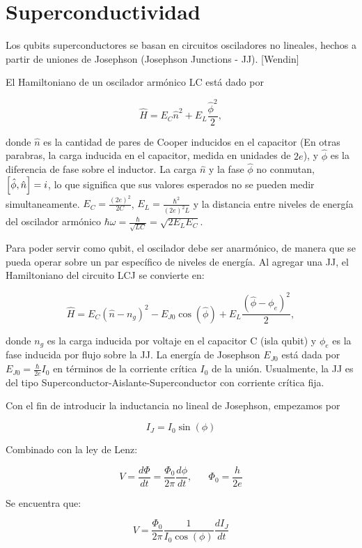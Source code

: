\documentclass[11pt, spanish]{report}
\begin{document}
\chapter{Superconductividad}
Los qubits superconductores se basan en circuitos osciladores no lineales, hechos a partir de uniones de Josephson (Josephson Junctions - JJ). [Wendin]
\vspace{0.5cm}

El Hamiltoniano de un oscilador armónico LC está dado por 

\[
\hat{H} = E_C \hat{n}^2 + E_L \frac{\hat{\phi}^2}{2},
\]

donde $\hat{n}$ es la cantidad de pares de Cooper inducidos en el capacitor (En otras parabras, la carga inducida en el capacitor, medida en unidades de $2e$), y $\hat{\phi}$ es la diferencia de fase sobre el inductor. La carga $\hat{n}$ y la fase $\hat{\phi}$ no conmutan, $\comm{\hat{\phi}}{\hat{n}}=i$, lo que significa que sus valores esperados no se pueden medir simultaneamente. $E_C=\frac{(2e)^2}{2C}$, $E_L=\frac{\hbar^2}{(2e)^2L}$ y la distancia entre niveles de energía del oscilador armónico $\hbar \omega = \frac{\hbar}{\sqrt{LC}}=\sqrt{2E_LE_C}$.
\vspace{0.5cm}

Para poder servir como qubit, el oscilador debe ser anarmónico, de manera que se pueda operar sobre un par específico de niveles de energía. Al agregar una JJ, el Hamiltoniano del circuito LCJ se convierte en:

\[
\hat{H} = E_C (\hat{n}-n_g)^2 - E_{J0} \cos( \hat{\phi} ) + E_L \frac{(\hat{\phi}-\phi_e)^2}{2},
\]

donde $n_g$ es la carga inducida por voltaje en el capacitor C (isla qubit) y $\phi_e$ es la fase inducida por flujo sobre la JJ. La energía de Josephson $E_{J0}$ está dada por $E_{J0}=\frac{\hbar}{2e}I_0$ en términos de la corriente crítica $I_0$ de la unión. Usualmente, la JJ es del tipo Superconductor-Aislante-Superconductor con corriente crítica fija.

Con el fin de introducir la inductancia no lineal de Josephson, empezamos por 

\[
I_J = I_0 \sin(\phi)
\]

Combinado con la ley de Lenz:

\[
V = \frac{d\Phi}{dt} = \frac{\Phi_0}{2\pi} \frac{d\phi}{dt}, \hspace{20pt} \Phi_0=\frac{h}{2e}
\]

Se encuentra que:

\[
V = \frac{\Phi_0}{2\pi} \frac{1}{I_0\cos(\phi)} \frac{dI_J}{dt}
\]
\end{document}

